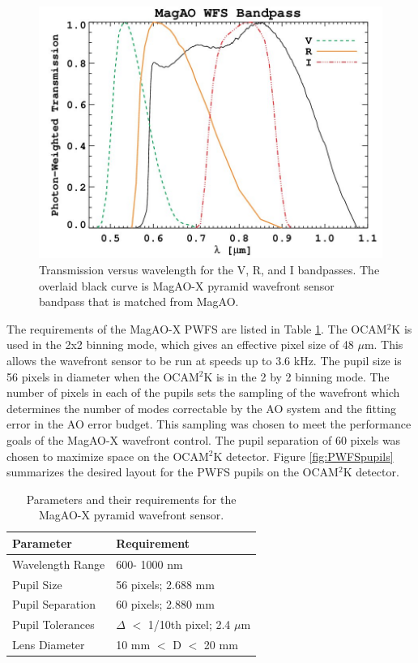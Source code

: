 	

\begin{figure}[h]
	\centering
	\includegraphics[width=.5\textwidth]{Chapter Materials/Chapter Three Materials/MagAOBandpass_updated.jpg}
	\caption{Transmission versus wavelength for the V, R, and I bandpasses. The overlaid black curve is MagAO-X pyramid wavefront sensor bandpass that is matched from MagAO.}
	\label{fig:bandpass}
\end{figure}
	
 The requirements of the MagAO-X PWFS are listed in Table \ref{tab:requirements}. The OCAM$^2$K is used in the 2x2 binning mode, which gives an effective pixel size of 48 $\mu$m. This allows the wavefront sensor to be run at speeds up to 3.6 kHz. The pupil size is 56 pixels in diameter when the OCAM$^2$K is in the 2 by 2 binning mode. The number of pixels in each of the pupils sets the sampling of the wavefront which determines the number of modes correctable by the AO system and the fitting error in the AO error budget. This sampling was chosen to meet the performance goals of the MagAO-X wavefront control. The pupil separation of 60 pixels was chosen to maximize space on the OCAM$^2$K detector. Figure \ref{fig:PWFSpupils} summarizes the desired layout for the PWFS pupils on the OCAM$^2$K detector. 
	
\begin{table}
	\begin{center}
		\begin{tabular}{ | l| l | }
			\hline
			\textbf{Parameter}& \textbf{Requirement} \\ \hline
			Wavelength Range &600- 1000 nm \\ \hline
			Pupil Size & 56 pixels; 2.688 mm \\ \hline
			Pupil Separation & 60 pixels; 2.880 mm  \\ \hline
			Pupil Tolerances & $\Delta$ $<$ 1/10th pixel; 2.4 $\mu$m  \\ \hline
			Lens Diameter & 10 mm $<$ D  $<$ 20 mm \\ \hline
				
		\end{tabular}
	\end{center}
	\caption{Parameters and their requirements for the MagAO-X pyramid wavefront sensor.}
	\label{tab:requirements}
\end{table}

